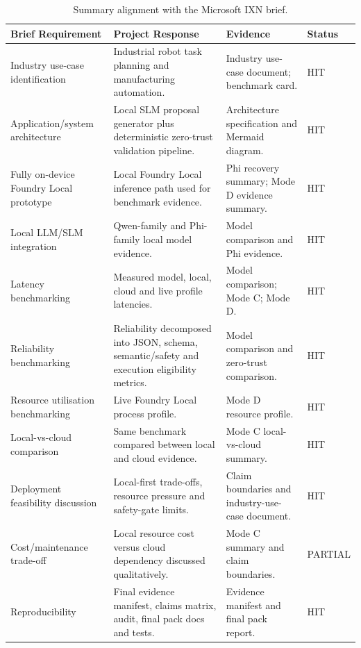 \documentclass[sigconf,nonacm]{acmart}
\begin{document}
\begin{table}[t]
\centering
\caption{Summary alignment with the Microsoft IXN brief.}
\label{tab:microsoft_brief_alignment}
\footnotesize
\begin{tabularx}{\textwidth}{L{0.22\textwidth}Y Y L{0.12\textwidth}}
\toprule
Brief Requirement & Project Response & Evidence & Status \\
\midrule
Industry use-case identification & Industrial robot task planning and manufacturing automation. & Industry use-case document; benchmark card. & HIT \\

Application/system architecture & Local SLM proposal generator plus deterministic zero-trust validation pipeline. & Architecture specification and Mermaid diagram. & HIT \\

Fully on-device Foundry Local prototype & Local Foundry Local inference path used for benchmark evidence. & Phi recovery summary; Mode D evidence summary. & HIT \\

Local LLM/SLM integration & Qwen-family and Phi-family local model evidence. & Model comparison and Phi evidence. & HIT \\

Latency benchmarking & Measured model, local, cloud and live profile latencies. & Model comparison; Mode C; Mode D. & HIT \\

Reliability benchmarking & Reliability decomposed into JSON, schema, semantic/safety and execution eligibility metrics. & Model comparison and zero-trust comparison. & HIT \\

Resource utilisation benchmarking & Live Foundry Local process profile. & Mode D resource profile. & HIT \\

Local-vs-cloud comparison & Same benchmark compared between local and cloud evidence. & Mode C local-vs-cloud summary. & HIT \\

Deployment feasibility discussion & Local-first trade-offs, resource pressure and safety-gate limits. & Claim boundaries and industry-use-case document. & HIT \\

Cost/maintenance trade-off & Local resource cost versus cloud dependency discussed qualitatively. & Mode C summary and claim boundaries. & PARTIAL \\

Reproducibility & Final evidence manifest, claims matrix, audit, final pack docs and tests. & Evidence manifest and final pack report. & HIT \\
\bottomrule
\end{tabularx}
\end{table}
\end{document}
